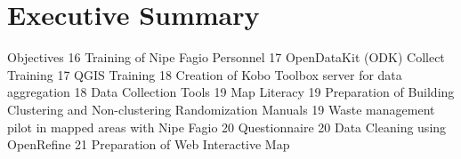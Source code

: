 \documentclass[a4paper,12pt,twoside]{article}
\begin{document}
\section{Executive Summary}

\begin{multicols}{2}
\lipsum[0-5]
\end{multicols}

Objectives	16
Training of Nipe Fagio Personnel	17
OpenDataKit (ODK) Collect Training	17
QGIS Training	18
Creation of Kobo Toolbox  server for data aggregation	18
Data Collection Tools	19
Map Literacy	19
Preparation of Building Clustering and Non-clustering Randomization Manuals	19
Waste management pilot in mapped areas with Nipe Fagio	20
Questionnaire	20
Data Cleaning using OpenRefine	21
Preparation of Web Interactive Map
\end{document}

